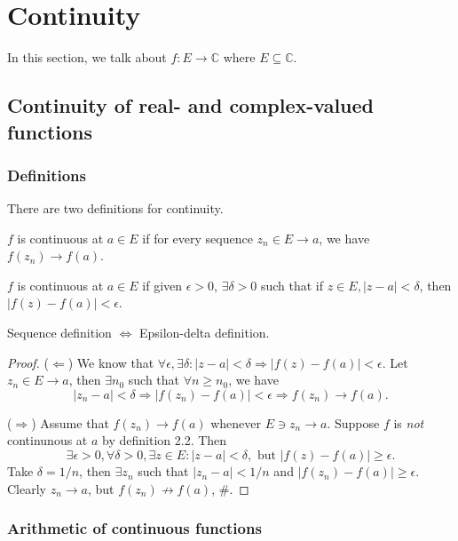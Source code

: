 \section{Continuity}
In this section, we talk about $ f:E \to \mathbb{C}  $ where $ E \subseteq \mathbb{C}  $.
\subsection{Continuity of real- and complex-valued functions}
\subsubsection{Definitions}

There are two definitions for continuity.

\begin{definition}
    $f$ is continuous at $ a\in E $ if for every sequence $ z_n\in E\to a $, we have $ f(z_n)\to f(a) $.
\end{definition}

\begin{definition}
    $f$ is continuous at $a\in E$ if given $ \epsilon>0 $, $ \exists \delta>0 $ such that if $ z\in E, |z-a|<\delta $, then $ |f(z)-f(a)|<\epsilon $.
\end{definition}

\begin{sprop}
    Sequence definition $ \Longleftrightarrow $ Epsilon-delta definition.
\end{sprop}
\begin{proof}
    ($ \Leftarrow $) We know that $ \forall \epsilon,\exists \delta: |z-a|<\delta \Rightarrow |f(z)-f(a)|<\epsilon $. Let $ z_n\in E \to a $, then $ \exists n_0 $ such that $ \forall n\ge n_0 $, we have
    \[
        |z_n-a|<\delta \Longrightarrow |f(z_n)-f(a)|<\epsilon \Longrightarrow f(z_n) \to f(a).
    \]

    ($ \Rightarrow $) Assume that $ f(z_n)\to f(a) $ whenever $E\ni z_n\to a $. Suppose $f$ is \textit{not} continunous at $a$ by definition 2.2. Then
    \[
        \exists \epsilon>0, \forall \delta>0, \exists z\in E: |z-a|<\delta,\text{ but } |f(z)-f(a)|\ge \epsilon.
    \]
    Take $ \delta=1/n $, then $ \exists  z_n $ such that $ |z_n-a|<1/n $ and $ |f(z_n)-f(a)|\ge \epsilon $. Clearly $ z_n\to a $, but $ f(z_n)\nrightarrow f(a) $, \#.
\end{proof}

\subsubsection{Arithmetic of continuous functions}

